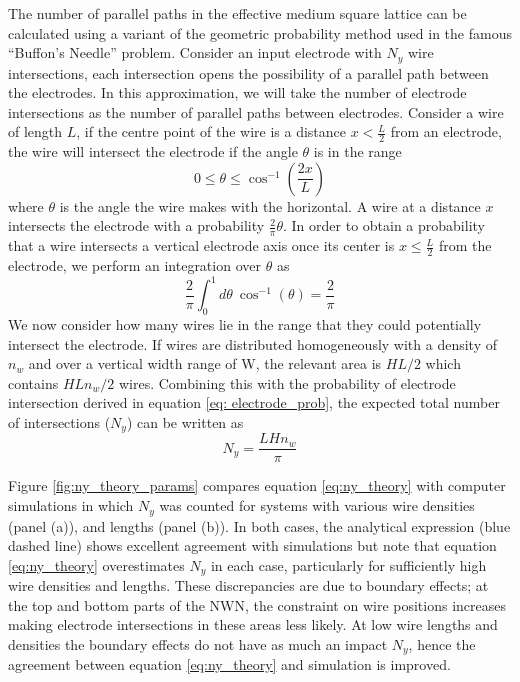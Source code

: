 The number of parallel paths in the effective medium square lattice can be calculated using a variant of the geometric probability method used in the famous ``Buffon's Needle'' problem\cite{buffon}. Consider an input electrode with $N_y$ wire intersections, each intersection opens the possibility of a parallel path between the electrodes. In this approximation, we will take the number of electrode intersections as the number of parallel paths between electrodes. Consider a wire of length $L$, if the centre point of the wire is a distance $x<\frac{L}{2}$ from an electrode, the wire will intersect the electrode if the angle $\theta$ is in the range
\begin{equation}
0 \leq \theta \leq \cos^{-1}\left(\frac{2x}{L}\right)
\end{equation}
\noindent where $\theta$ is the angle the wire makes with the horizontal. A wire at a distance $x$ intersects the electrode with a probability $\frac{2}{\pi} \theta$. In order to obtain a probability that a wire intersects a vertical electrode axis once its center is $x \leq \frac{L}{2}$ from the electrode, we perform an integration over $\theta$ as
\begin{equation}
\frac{2}{\pi} \int_0^1 d\theta~ \cos^{-1}(\theta) = \frac{2}{\pi}
\label{eq: electrode_prob}
\end{equation}
We now consider how many wires lie in the range that they could potentially intersect the electrode. If wires are distributed homogeneously with a density of $n_w$ and over a vertical width range of W, the relevant area is $HL/2$ which contains $HLn_w/2$ wires. Combining this with the probability of electrode intersection derived in equation \ref{eq: electrode_prob}, the expected total number of intersections ($N_y$) can be written as
\begin{equation}
N_y = \frac{L H n_w}{\pi}
\label{eq:ny_theory}
\end{equation}

Figure \ref{fig:ny_theory_params} compares equation \ref{eq:ny_theory} with computer simulations in which $N_y$ was counted for systems with various wire densities (panel (a)), and lengths (panel (b)). In both cases, the analytical expression (blue dashed line) shows excellent agreement with simulations but note that equation \ref{eq:ny_theory} overestimates $N_y$ in each case, particularly for sufficiently high wire densities and lengths. These discrepancies are due to boundary effects; at the top and bottom parts of the NWN, the constraint on wire positions increases making electrode intersections in these areas less likely. At low wire lengths and densities the boundary effects do not have as much an impact $N_y$, hence the agreement between equation \ref{eq:ny_theory} and simulation is improved.

